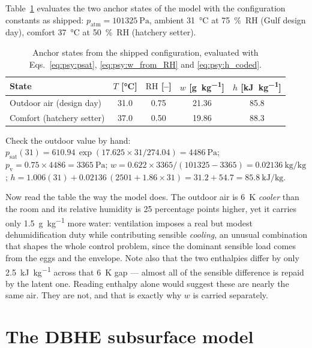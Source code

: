 \documentclass[11pt]{article}
\providecommand{\celsius}{\degreeCelsius}
\newcommand{\patm}{\ensuremath{p_{\mathrm{atm}}}}
\newcommand{\psat}{\ensuremath{p_{\mathrm{sat}}}}
\newcommand{\RH}{\ensuremath{\mathrm{RH}}}
\begin{document}
Table~\ref{tab:psy:design} evaluates the two anchor states of the model with the configuration
constants as shipped: $\patm = \SI{101325}{\pascal}$, ambient \SI{31}{\celsius} at
\SI{75}{\percent}~RH (Gulf design day), comfort \SI{37}{\celsius} at \SI{50}{\percent}~RH (hatchery
setter).

\begin{table}[htbp]
\centering
\caption{Anchor states from the shipped configuration, evaluated with
Eqs.~\eqref{eq:psy:psat}, \eqref{eq:psy:w_from_RH} and \eqref{eq:psy:h_coded}.}
\label{tab:psy:design}
\begin{tabular}{@{}lcccc@{}}
\toprule
State & $T$ [\si{\celsius}] & $\RH$ [--]
& $w$ [\si{\gram\per\kilogram}] & $h$ [\si{\kilo\joule\per\kilogram}] \\
\midrule
Outdoor air (design day)  & 31.0 & 0.75 & 21.36 & 85.8 \\
Comfort (hatchery setter) & 37.0 & 0.50 & 19.86 & 88.3 \\
\bottomrule
\end{tabular}
\end{table}

Check the outdoor value by hand: $\psat(31) = 610.94\,\exp(17.625 \times 31/274.04) =
\SI{4486}{\pascal}$; $p_{\mathrm{v}} = 0.75 \times 4486 = \SI{3365}{\pascal}$; $w = 0.622 \times
3365/(101325 - 3365) = \SI{0.02136}{\kilogram\per\kilogram}$; $h = 1.006(31) + 0.02136\,(2501 + 1.86
\times 31) = 31.2 + 54.7 = \SI{85.8}{\kilo\joule\per\kilogram}$.

Now read the table the way the model does. The outdoor air is \SI{6}{\kelvin} \emph{cooler} than the
room and its relative humidity is 25 percentage points higher, yet it carries only
\SI{1.5}{\gram\per\kilogram} more water: ventilation imposes a real but modest dehumidification duty
while contributing sensible \emph{cooling}, an unusual combination that shapes the whole control
problem, since the dominant sensible load comes from the eggs and the envelope. Note also that the
two enthalpies differ by only \SI{2.5}{\kilo\joule\per\kilogram} across that \SI{6}{\kelvin} gap ---
almost all of the sensible difference is repaid by the latent one. Reading enthalpy alone would
suggest these are nearly the same air. They are not, and that is exactly why $w$ is carried
separately.

\section{The DBHE subsurface model}
\label{sec:dbhe}
\end{document}
